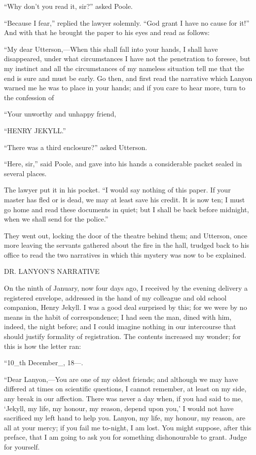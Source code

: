 \documentclass[12pt,openright]{book}
\begin{document}
“Why don’t you read it, sir?” asked Poole.

“Because I fear,” replied the lawyer solemnly. “God grant I have no cause for it!” And with that he brought the paper to his eyes and read as follows:

“My dear Utterson,—When this shall fall into your hands, I shall have disappeared, under what circumstances I have not the penetration to foresee, but my instinct and all the circumstances of my nameless situation tell me that the end is sure and must be early. Go then, and first read the narrative which Lanyon warned me he was to place in your hands; and if you care to hear more, turn to the confession of

“Your unworthy and unhappy friend,

“HENRY JEKYLL.”

“There was a third enclosure?” asked Utterson.

“Here, sir,” said Poole, and gave into his hands a considerable packet sealed in several places.

The lawyer put it in his pocket. “I would say nothing of this paper. If your master has fled or is dead, we may at least save his credit. It is now ten; I must go home and read these documents in quiet; but I shall be back before midnight, when we shall send for the police.”

They went out, locking the door of the theatre behind them; and Utterson, once more leaving the servants gathered about the fire in the hall, trudged back to his office to read the two narratives in which this mystery was now to be explained.

DR. LANYON’S NARRATIVE

On the ninth of January, now four days ago, I received by the evening delivery a registered envelope, addressed in the hand of my colleague and old school companion, Henry Jekyll. I was a good deal surprised by this; for we were by no means in the habit of correspondence; I had seen the man, dined with him, indeed, the night before; and I could imagine nothing in our intercourse that should justify formality of registration. The contents increased my wonder; for this is how the letter ran:

“10\_th December\_, 18—.

“Dear Lanyon,—You are one of my oldest friends; and although we may have differed at times on scientific questions, I cannot remember, at least on my side, any break in our affection. There was never a day when, if you had said to me, ‘Jekyll, my life, my honour, my reason, depend upon you,’ I would not have sacrificed my left hand to help you. Lanyon, my life, my honour, my reason, are all at your mercy; if you fail me to-night, I am lost. You might suppose, after this preface, that I am going to ask you for something dishonourable to grant. Judge for yourself.
\end{document}
